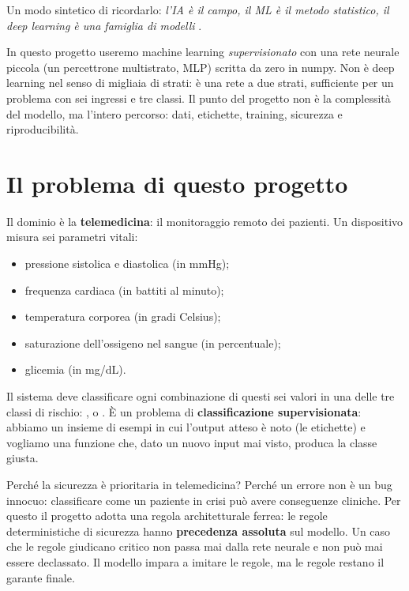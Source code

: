 Un modo sintetico di ricordarlo: \emph{l'IA è il campo, il ML è il metodo
statistico, il deep learning è una famiglia di modelli}
\cite{goodfellow2016deep, knowledge_fond2026}.

In questo progetto useremo machine learning \emph{supervisionato} con una
rete neurale piccola (un percettrone multistrato, MLP) scritta da zero in
numpy. Non è deep learning nel senso di migliaia di strati: è una rete a due
strati, sufficiente per un problema con sei ingressi e tre classi. Il punto
del progetto non è la complessità del modello, ma l'intero percorso: dati,
etichette, training, sicurezza e riproducibilità.

\section{Il problema di questo progetto}\label{sec:problema-progetto}

Il dominio è la \textbf{telemedicina}: il monitoraggio remoto dei pazienti.
Un dispositivo misura sei parametri vitali:

\begin{itemize}
  \item pressione sistolica e diastolica (in mmHg);
  \item frequenza cardiaca (in battiti al minuto);
  \item temperatura corporea (in gradi Celsius);
  \item saturazione dell'ossigeno nel sangue (in percentuale);
  \item glicemia (in mg/dL).
\end{itemize}

Il sistema deve classificare ogni combinazione di questi sei valori in una
delle tre classi di rischio: ,  o .
È un problema di \textbf{classificazione supervisionata}: abbiamo un insieme
di esempi in cui l'output atteso è noto (le etichette) e vogliamo una
funzione che, dato un nuovo input mai visto, produca la classe giusta.

Perché la sicurezza è prioritaria in telemedicina? Perché un errore non è un
bug innocuo: classificare come  un paziente in crisi può avere
conseguenze cliniche. Per questo il progetto adotta una regola architetturale
ferrea: le regole deterministiche di sicurezza hanno \textbf{precedenza
assoluta} sul modello. Un caso che le regole giudicano critico non passa mai
dalla rete neurale e non può mai essere declassato. Il modello impara a
imitare le regole, ma le regole restano il garante finale.

